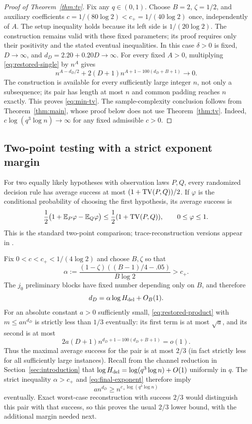 \begin{proof}[Proof of Theorem~\ref{thm:tv}]
Fix any $q\in(0,1)$.  Choose $B=2$, $\zeta=1/2$, and auxiliary coefficients $c=1/(80\log2)<c_+=1/(40\log2)$ once, independently of $A$.  The setup inequality holds because its left side is $1/(20\log2)$.  The construction remains valid with these fixed parameters; its proof requires only their positivity and the stated eventual inequalities.  In this case $\delta>0$ is fixed, $D\to\infty$, and $d_D=2.20+0.20D\to\infty$.  For every fixed $A>0$, multiplying \eqref{eq:restored-single} by $n^A$ gives
\[
 n^{A-d_D/2}+2(D+1)n^{A+1-100(d_D+B+1)}\longrightarrow0.
\]
The construction is available for every sufficiently large integer $n$, not only a subsequence; its pair has length at most $n$ and common padding reaches $n$ exactly.  This proves \eqref{eq:min-tv}.  The sample-complexity conclusion follows from Theorem~\ref{thm:main}, whose proof below does not use Theorem~\ref{thm:tv}.  Indeed, $c\log(q^3\log n)\to\infty$ for any fixed admissible $c>0$.
\end{proof}

\subsection{Two-point testing with a strict exponent margin}

For two equally likely hypotheses with observation laws $P,Q$, every randomized decision rule has average success at most $(1+\operatorname{TV}(P,Q))/2$.  If $\varphi$ is the conditional probability of choosing the first hypothesis, its average success is
\[
 \frac12\bigl(1+\mathbb E_P\varphi-\mathbb E_Q\varphi\bigr)
 \le\frac12(1+\operatorname{TV}(P,Q)),\qquad 0\le\varphi\le1.
\]
This is the standard two-point comparison; trace-reconstruction versions appear in \citet[Appendix A.2]{HoldenLyons2020}.

Fix $0<c<c_+<1/(4\log2)$ and choose $B,\zeta$ so that
\[
 \alpha:=\frac{(1-\zeta)((B-1)/4-.05)}{B\log2}>c_+.
\]
The $j_0$ preliminary blocks have fixed number depending only on $B$, and therefore
\begin{equation}\label{eq:final-exponent}
 d_D=\alpha\log H_{\rm del}+O_B(1).
\end{equation}
For an absolute constant $a>0$ sufficiently small, \eqref{eq:restored-product} with $m\le a n^{d_D}$ is strictly less than $1/3$ eventually: its first term is at most $\sqrt a$, and its second is at most
\[
 2a(D+1)n^{d_D+1-100(d_D+B+1)}=o(1).
\]
Thus the maximal average success for the pair is at most $2/3$ (in fact strictly less for all sufficiently large instances).  Recall from the channel reduction in Section~\ref{sec:introduction} that $\log H_{\rm del}=\log(q^3\log n)+O(1)$ uniformly in $q$.  The strict inequality $\alpha>c_+$ and \eqref{eq:final-exponent} therefore imply
\begin{equation}\label{eq:intermediate-threshold}
 a n^{d_D}\ge n^{c_+\log(q^3\log n)}
\end{equation}
eventually.  Exact worst-case reconstruction with success $2/3$ would distinguish this pair with that success, so this proves the usual $2/3$ lower bound, with the additional margin needed next.

